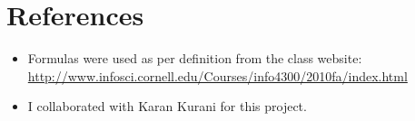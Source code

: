 \documentclass[12pt]{article}
\begin{document}
\section{References} %
\label{sec:references}
\begin{itemize}
  \item Formulas were used as per definition from the class website: \url{http://www.infosci.cornell.edu/Courses/info4300/2010fa/index.html}
  \item I collaborated with Karan Kurani for this project.
\end{itemize}
\end{document}
